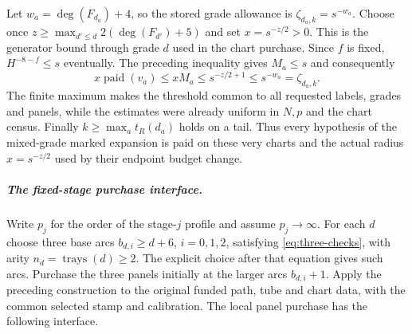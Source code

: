Let $w_a=\deg(F_{d_a})+4$, so the stored grade allowance is
$\zeta_{d_a,k}=s^{-w_a}$. Choose once
$z\ge\max_{d'\le d}2(\deg(F_{d'})+5)$ and set
$x=s^{-z/2}>0$. This is the generator bound through grade $d$
used in the chart purchase. Since $f$ is fixed,
$H^{-8-f}\le s$ eventually. The preceding inequality gives
$M_a\le s$ and consequently
\[
 x\operatorname{paid}(v_a)\le xM_a
       \le s^{-z/2+1}\le s^{-w_a}=\zeta_{d_a,k}.
\]
The finite maximum makes the threshold common to all requested
labels, grades and panels, while the estimates were already uniform
in $N,p$ and the chart census. Finally $k\ge\max_a t_R(d_a)$ holds
on a tail. Thus every hypothesis of the mixed-grade marked expansion
is paid on these very charts and the actual radius $x=s^{-z/2}$
used by their endpoint budget change.

\subparagraph{The fixed-stage purchase interface.}
Write $p_j$ for the order of the stage-$j$ profile and assume $p_j\to\infty$.
For each $d$ choose three base arcs $b_{d,i}\ge d+6$, $i=0,1,2$, satisfying
\eqref{eq:three-checks}, with arity $n_d=\operatorname{trays}(d)\ge2$.
The explicit choice after that equation gives such arcs. Purchase the
three panels initially at the larger arcs $b_{d,i}+1$. Apply the preceding construction to the original funded path, tube and
chart data, with the common selected stamp and calibration. The local
panel purchase has the following interface.
